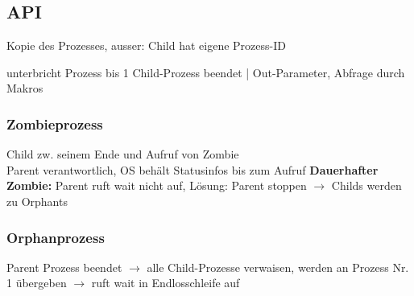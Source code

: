 \subsection{API}
Kopie des Prozesses, ausser: Child hat eigene Prozess-ID

 unterbricht Prozess bis 1 Child-Prozess beendet |  Out-Parameter, Abfrage durch Makros

\subsubsection{Zombieprozess}
Child zw. seinem Ende und Aufruf von  Zombie\\
Parent verantwortlich, OS behält Statusinfos bis zum Aufruf
\textbf{Dauerhafter Zombie: } Parent ruft wait nicht auf, Lösung: Parent stoppen $\rightarrow$ Childs werden zu Orphants

\subsubsection{Orphanprozess}
Parent Prozess beendet $\rightarrow$ alle Child-Prozesse verwaisen, werden an Prozess Nr. 1 übergeben $\rightarrow$ ruft wait in Endlosschleife auf